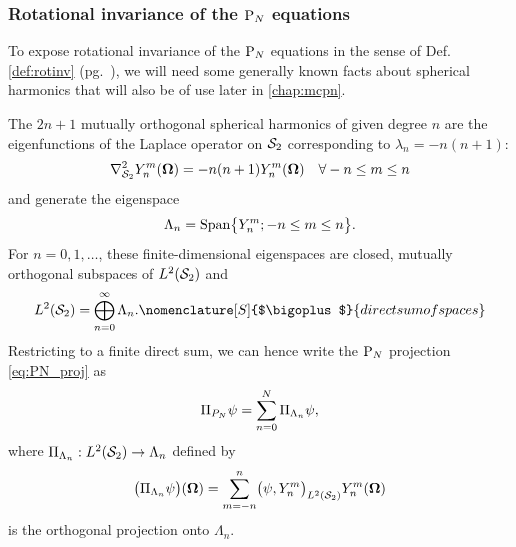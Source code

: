 \subsubsection{Rotational invariance of the $\PN$ equations}\label{sec:dirinvPN}
To expose rotational invariance of the $\PN$ equations in the sense of Def. \ref{def:rotinv} (pg.~\pageref{def:rotinv}),
we will need some generally known facts about spherical harmonics 
that will also be of use later in \cref{chap:mcpn}.

The $2n + 1$ mutually orthogonal spherical harmonics of given degree $n$ are the eigenfunctions of the Laplace
operator on $\Sphere$ corresponding to $\lambda_n = -n(n+1)$: 
$$
	\lap_{\Sphere} \Y{n}{m}(\bomega) = -n(n+1)\Y{n}{m}(\bomega) \quad \forall -n \leq m \leq n
$$
and generate the eigenspace
\begin{equation}
	\label{eq:subspace}
    	\Lambda_n = \text{Span}\bigl\{\Y{n}{m}; -n \leq m \leq n\bigr\}.
\end{equation}
For $n = 0,1,\ldots$, these finite-dimensional eigenspaces are closed, mutually orthogonal subspaces of
$\Lp[2](\Sphere)$ and
\begin{equation}\label{eq:direct_sum_L2}
	\Lp[2](\Sphere) = \bigoplus_{n=0}^{\infty}\Lambda_n. \nomenclature[S]{$\bigoplus$}{direct sum of
spaces}
\end{equation}
Restricting to a finite direct sum, we can hence write the $\PN$ projection \eqref{eq:PN_proj} as
\begin{equation}\label{eq:pn_approx2}
	\Projop\psi = \suma[n]{0}{N}\Projop[\Lambda_n]\psi,
\end{equation}
where $\Projop[\Lambda_n] : \Lp[2](\Sphere) \to \Lambda_n$ defined by
$$
	\bigl(\Projop[\Lambda_n]\psi\bigr)(\bomega) =
	\suma[m]{-n}{n}\bigl(\psi,\Y{n}{m}\bigr)_{\Lp[2](\Sphere)}\Y{n}{m}(\bomega) 
$$
is the orthogonal projection onto $\Lambda_n$. 

